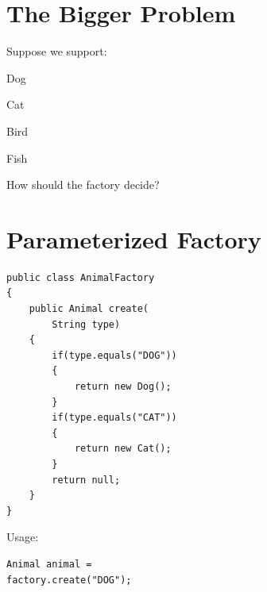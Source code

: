 \documentclass[11pt,a4paper]{book}
\begin{document}

\section{The Bigger Problem}

Suppose we support:


Dog


Cat


Bird


Fish


How should the factory decide?


\section{Parameterized Factory}

\begin{verbatim}
public class AnimalFactory
{
    public Animal create(
        String type)
    {
        if(type.equals("DOG"))
        {
            return new Dog();
        }
        if(type.equals("CAT"))
        {
            return new Cat();
        }
        return null;
    }
}
\end{verbatim}


Usage:

\begin{verbatim}
Animal animal =
factory.create("DOG");
\end{verbatim}


\end{document}
